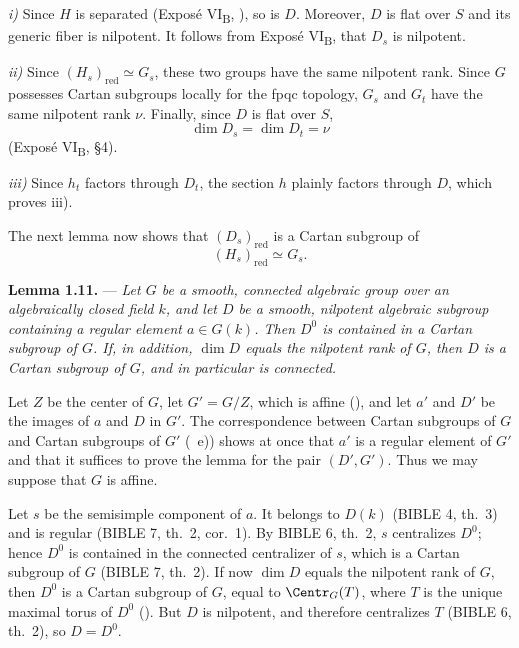\noindent\textit{i)}
Since \(H\) is separated (Exposé VI\textsubscript{B}, ), so is
\(D\). Moreover, \(D\) is flat over \(S\) and its generic fiber is
nilpotent. It follows from Exposé VI\textsubscript{B},  that
\(D_s\) is nilpotent.

\smallskip
\noindent\textit{ii)}
Since \((H_s)_{\mathrm{red}}\simeq G_s\), these two groups have the
same nilpotent rank. Since \(G\) possesses Cartan subgroups locally
for the fpqc topology, \(G_s\) and \(G_t\) have the same nilpotent
rank \(\nu\). Finally, since \(D\) is flat over \(S\),
\[
  \dim D_s=\dim D_t=\nu
\]
(Exposé VI\textsubscript{B}, \S4).

\smallskip
\noindent\textit{iii)}
Since \(h_t\) factors through \(D_t\), the section \(h\) plainly
factors through \(D\), which proves iii).

The next lemma now shows that \((D_s)_{\mathrm{red}}\) is a Cartan
subgroup of
\[
  (H_s)_{\mathrm{red}}\simeq G_s.
\]

\medskip
\noindent{}%
\textbf{Lemma 1.11.} --- \textit{Let \(G\) be a smooth, connected
algebraic group over an algebraically closed field \(k\), and let
\(D\) be a smooth, nilpotent algebraic subgroup containing a regular
element \(a\in G(k)\). Then \(D^0\) is contained in a Cartan subgroup
of \(G\). If, in addition, \(\dim D\) equals the nilpotent rank of
\(G\), then \(D\) is a Cartan subgroup of \(G\), and in particular is
connected.}

Let \(Z\) be the center of \(G\), let \(G'=G/Z\), which is affine
(), and let \(a'\) and \(D'\) be the images of \(a\)
and \(D\) in \(G'\). The correspondence between Cartan subgroups of
\(G\) and Cartan subgroups of \(G'\) (~e)) shows at
once that \(a'\) is a regular element of \(G'\) and that it suffices
to prove the lemma for the pair \((D',G')\). Thus we may suppose that
\(G\) is affine.

Let \(s\) be the semisimple component of \(a\). It belongs to
\(D(k)\) (BIBLE 4, th.~3) and is regular (BIBLE 7, th.~2, cor.~1).
By BIBLE 6, th.~2, \(s\) centralizes \(D^0\); hence \(D^0\) is
contained in the connected centralizer of \(s\), which is a Cartan
subgroup of \(G\) (BIBLE 7, th.~2). If now
\(\dim D\) equals the nilpotent rank of \(G\), then \(D^0\) is a
Cartan subgroup of \(G\), equal to \(\Centr_G(T)\), where \(T\) is
the unique maximal torus of \(D^0\) (). But \(D\) is
nilpotent, and therefore centralizes \(T\) (BIBLE 6, th.~2), so
\(D=D^0\).

